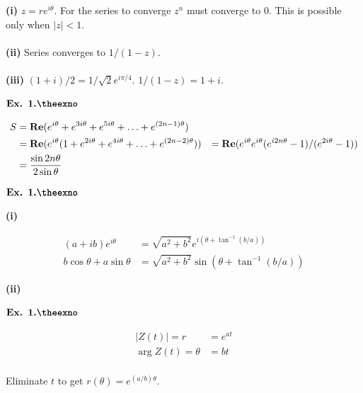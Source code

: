 \documentclass{article}
\def\tf{\textbf}
\def\mf{\ensuremath\mathbf}
\newcounter{exno}
\begin{document}
\tf{(i)} $z=re^{i\theta}$. For the series to converge $z^{n}$ must converge to $0$. This is possible only when $|z|<1$.\\~\\

\tf{(ii)} Series converges to $1/(1-z)$.\\~\\

\tf{(iii)} $(1+i)/2 = 1/\sqrt{2}e^{i\pi/4}$. $1/(1-z) = 1+i$.

\vspace{0.2in}

${\textbf{Ex. 1.\theexno}}$
\addtocounter{exno}{1}

\begin{align*}
    S &= \mf{Re}(e^{i\theta}+e^{3i\theta}+e^{5i\theta}+\ldots+e^{(2n-1)\theta})\\
    &= \mf{Re}(e^{i\theta}(1+e^{2i\theta}+e^{4i\theta}+\ldots+e^{(2n-2)\theta}))
    &= \mf{Re}(e^{i\theta}e^{i\theta}(e^{i2n\theta}-1)/(e^{2i\theta}-1))\\
    &= \frac{\sin 2n\theta}{2\sin\theta}
\end{align*}

\vspace{0.2in}

${\textbf{Ex. 1.\theexno}}$
\addtocounter{exno}{1}

\tf{(i)}

\begin{align*}
    (a+ib)e^{i\theta} &= \sqrt{a^2+b^2}e^{i(\theta + \tan^{-1}(b/a))}\\
    b\cos\theta + a\sin\theta &= \sqrt{a^2+b^2}\sin(\theta+\tan^{-1}(b/a))
\end{align*}

\tf{(ii)}


\vspace{0.2in}

${\textbf{Ex. 1.\theexno}}$
\addtocounter{exno}{1}

\begin{align*}
    |Z(t)| = r &= e^{at}\\
    \arg Z(t) = \theta &= bt\\
\end{align*}

Eliminate $t$ to get $r(\theta) = e^{(a/b)\theta}$.

\vspace{0.2in}
\end{document}
